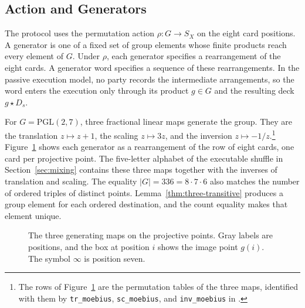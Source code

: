 \documentclass[runningheads]{llncs}
\newcommand{\coqin}[1]{\texttt{#1}}
\newcommand{\PG}{\mathrm{PGL}(2,7)}
\begin{document}
\subsection{Action and Generators}

The protocol uses the permutation action $\rho:G\to S_X$ on the eight card
positions. A generator is one of a fixed set of group elements whose finite
products reach every element of $G$. Under $\rho$, each generator specifies
a rearrangement of the eight cards. A generator word specifies a
sequence of these rearrangements. In the passive execution model, no party
records the intermediate arrangements, so the word enters the execution
only through its product $g\in G$ and the resulting deck $g\star D_s$.

For $G=\PG$, three fractional linear maps generate the group. They are the
translation $z\mapsto z+1$, the scaling $z\mapsto 3z$, and the inversion
$z\mapsto -1/z$.\footnote{The rows of Figure~\ref{fig:pgl-generators} are
the permutation tables of the three maps, identified with them by
\coqin{tr\_moebius}, \coqin{sc\_moebius}, and \coqin{inv\_moebius} in
.}
Figure~\ref{fig:pgl-generators} shows each generator as a rearrangement of
the row of eight cards, one card per projective point. The five-letter
alphabet of the executable shuffle in Section~\ref{sec:mixing} contains
these three maps together with the inverses of translation and scaling.
The equality $|G|=336=8\cdot7\cdot6$ also matches the number of ordered
triples of distinct points. Lemma~\ref{thm:three-transitive} produces a
group element for each ordered destination, and the count equality makes
that element unique.

\begin{figure}[t]
  \centering
  \caption{The three generating maps on the projective points. Gray labels
  are positions, and the box at position $i$ shows the image point $g(i)$.
  The symbol $\infty$ is position seven.}
  \label{fig:pgl-generators}
\end{figure}
\end{document}
